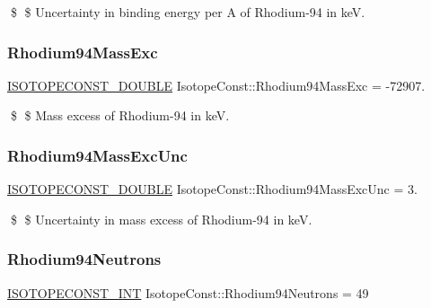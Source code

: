 \$ \$ Uncertainty in binding energy per A of Rhodium-\/94 in keV. \mbox{\label{group___isotope_const-_rhodium-_rh94_gacd2ee5a09f70cd018d3635ee0fd09d16}} 
\subsubsection{\texorpdfstring{Rhodium94\+Mass\+Exc}{Rhodium94MassExc}}
{\footnotesize\ttfamily \mbox{\hyperlink{group___isotope_const-_macros_ga8f45a7272ce02c0b4c65c44636ed719a}{I\+S\+O\+T\+O\+P\+E\+C\+O\+N\+S\+T\+\_\+\+D\+O\+U\+B\+LE}} Isotope\+Const\+::\+Rhodium94\+Mass\+Exc = -\/72907.}

\$ \$ Mass excess of Rhodium-\/94 in keV. \mbox{\label{group___isotope_const-_rhodium-_rh94_ga0b3b094890b802f81c2c126fe9f92669}} 
\subsubsection{\texorpdfstring{Rhodium94\+Mass\+Exc\+Unc}{Rhodium94MassExcUnc}}
{\footnotesize\ttfamily \mbox{\hyperlink{group___isotope_const-_macros_ga8f45a7272ce02c0b4c65c44636ed719a}{I\+S\+O\+T\+O\+P\+E\+C\+O\+N\+S\+T\+\_\+\+D\+O\+U\+B\+LE}} Isotope\+Const\+::\+Rhodium94\+Mass\+Exc\+Unc = 3.}

\$ \$ Uncertainty in mass excess of Rhodium-\/94 in keV. \mbox{\label{group___isotope_const-_rhodium-_rh94_ga67a3f04da8dd750c7a7118ae54facbe5}} 
\subsubsection{\texorpdfstring{Rhodium94\+Neutrons}{Rhodium94Neutrons}}
{\footnotesize\ttfamily \mbox{\hyperlink{group___isotope_const-_macros_ga5f18360b3e99483a35c32d789e62621c}{I\+S\+O\+T\+O\+P\+E\+C\+O\+N\+S\+T\+\_\+\+I\+NT}} Isotope\+Const\+::\+Rhodium94\+Neutrons = 49}

